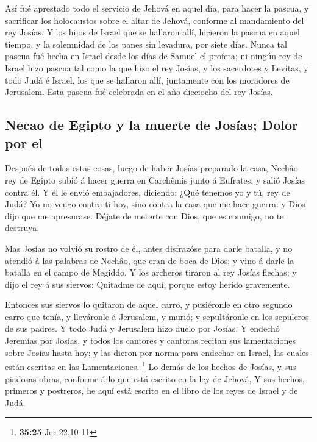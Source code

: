  Así fué aprestado todo el servicio de Jehová en aquel día,
para hacer la pascua, y sacrificar los holocaustos sobre el altar de
Jehová, conforme al mandamiento del rey Josías.  Y los
hijos de Israel que se hallaron allí, hicieron la pascua en aquel
tiempo, y la solemnidad de los panes sin levadura, por siete días.
 Nunca tal pascua fué hecha en Israel desde los días de
Samuel el profeta; ni ningún rey de Israel hizo pascua tal como la que
hizo el rey Josías, y los sacerdotes y Levitas, y todo Judá é Israel,
los que se hallaron allí, juntamente con los moradores de Jerusalem.
 Esta pascua fué celebrada en el año dieciocho del rey
Josías.

\hypertarget{necao-de-egipto-y-la-muerte-de-josuxedas-dolor-por-el}{%
\subsection{Necao de Egipto y la muerte de Josías; Dolor por
el}\label{necao-de-egipto-y-la-muerte-de-josuxedas-dolor-por-el}}

 Después de todas estas cosas, luego de haber Josías
preparado la casa, Nechâo rey de Egipto subió á hacer guerra en
Carchêmis junto á Eufrates; y salió Josías contra él.  Y él
le envió embajadores, diciendo: ¿Qué tenemos yo y tú, rey de Judá? Yo no
vengo contra ti hoy, sino contra la casa que me hace guerra: y Dios dijo
que me apresurase. Déjate de meterte con Dios, que es conmigo, no te
destruya.

 Mas Josías no volvió su rostro de él, antes disfrazóse
para darle batalla, y no atendió á las palabras de Nechâo, que eran de
boca de Dios; y vino á darle la batalla en el campo de Megiddo.
 Y los archeros tiraron al rey Josías flechas; y dijo el
rey á sus siervos: Quitadme de aquí, porque estoy herido gravemente.

 Entonces sus siervos lo quitaron de aquel carro, y
pusiéronle en otro segundo carro que tenía, y lleváronle á Jerusalem, y
murió; y sepultáronle en los sepulcros de sus padres. Y todo Judá y
Jerusalem hizo duelo por Josías.  Y endechó Jeremías por
Josías, y todos los cantores y cantoras recitan sus lamentaciones sobre
Josías hasta hoy; y las dieron por norma para endechar en Israel, las
cuales están escritas en las Lamentaciones. \footnote{\textbf{35:25} Jer
  22,10-11}  Lo demás de los hechos de Josías, y sus
piadosas obras, conforme á lo que está escrito en la ley de Jehová,
 Y sus hechos, primeros y postreros, he aquí está escrito
en el libro de los reyes de Israel y de Judá.

